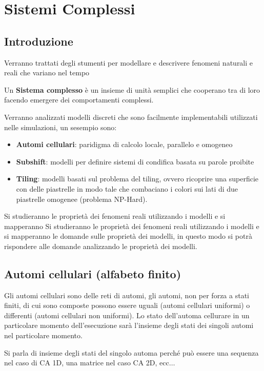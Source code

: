 \chapter{Sistemi Complessi}
\section{Introduzione}
Verranno trattati degli stumenti per modellare e descrivere fenomeni naturali e reali
che variano nel tempo
\begin{definizione}
    Un \textbf{Sistema complesso} è un insieme di unità semplici che cooperano tra
    di loro facendo emergere dei comportamenti complessi.
\end{definizione}
Verranno analizzati modelli discreti che sono facilmente implementabili utilizzati
nelle simulazioni, un sesempio sono:
\begin{itemize}
    \item \textbf{Automi cellulari}: paridigma di calcolo locale, parallelo e omogeneo
    \item \textbf{Subshift}: modelli per definire sistemi di condifica basata su
          parole proibite
    \item \textbf{Tiling}: modelli basati sul problema del tiling, ovvero ricoprire
          una superficie con delle piastrelle in modo tale che combaciano i colori sui
          lati di due piastrelle omogenee (problema NP-Hard).
\end{itemize}

Si studieranno le proprietà dei fenomeni reali utilizzando i modelli e si mapperanno
Si studieranno le proprietà dei fenomeni reali utilizzando i modelli e si mapperanno
le domande sulle proprietà dei modelli, in questo modo si potrà rispondere alle
domande analizzando le proprietà dei modelli.

\section{Automi cellulari (alfabeto finito)}
Gli automi cellulari sono delle reti di automi, gli automi, non per forza a stati
finiti, di cui sono composte possono essere uguali (automi cellulari uniformi) o differenti (automi cellulari non
uniformi). Lo stato dell'automa cellurare in un particolare momento dell'esecuzione
sarà l'insieme degli stati dei singoli automi nel particolare momento.

\begin{nota}
    Si parla di insieme degli stati del singolo automa perché può essere una
    sequenza nel caso di CA 1D, una matrice nel caso CA 2D, ecc$\dots$
\end{nota}

